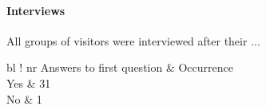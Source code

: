 
\paragraph{Interviews} All groups of visitors were interviewed after their ...

\begin{table}[H]
	\centering
	\begin{tabular}{ bl !{\vrule width 1pt} nr }
		\rowstyle{\bfseries}
		Answers	to first question	& Occurrence 	\\
		\toprule
		Yes												& 31					\\
		No												& 1						\\
	\end{tabular}
	\caption{Answers to the first question of the main study's interview.}
	\label{tab:main_study_question_1}  
\end{table}

